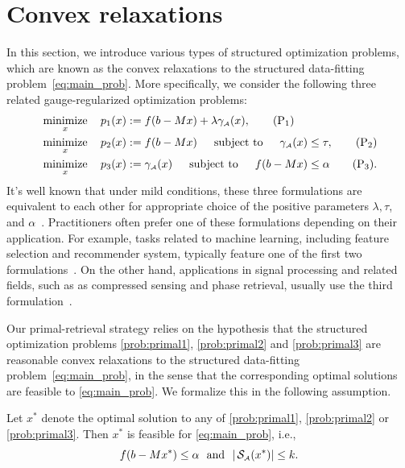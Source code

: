 \section{Convex relaxations}
\label{sec:4-2}

In this section, we introduce various types of structured optimization problems, which are known as the convex relaxations to the structured data-fitting problem~\eqref{eq:main_prob}. More specifically, 
we consider the following three related gauge-regularized optimization
problems:
\begin{align} 
  & \displaystyle\mathop{\hbox{\rm minimize}}_{x}\enspace\enspace p_1(x) := f(b - Mx) + \lambda\gamma_{\scriptscriptstyle\mathcal{A}}(x), \label{prob:primal1} \tag{P$_1$} \\
  & \displaystyle\mathop{\hbox{\rm minimize}}_{x}\enspace\enspace p_2(x) := f(b - Mx) \enspace\hbox{\quad subject to\quad}\enspace \gamma_{\scriptscriptstyle\mathcal{A}}(x) \leq \tau, \label{prob:primal2} \tag{P$_2$} \\
  & \displaystyle\mathop{\hbox{\rm minimize}}_{x}\enspace\enspace p_3(x) := \gamma_{\scriptscriptstyle\mathcal{A}}(x)  \enspace\hbox{\quad subject to\quad}\enspace f(b - Mx) \leq \alpha \label{prob:primal3} \tag{P$_3$}. 
\end{align}
It's well known that under mild conditions, these three formulations are equivalent to each other for appropriate choice of the positive parameters $\lambda, \tau$, and $\alpha$~\cite{FrieTsen:2006}. Practitioners often prefer one of these formulations depending on their application. For example, tasks related to machine learning, including feature selection and recommender system, typically feature one of the first two formulations~\cite{tibshirani1996regression,yul06,Meinshausen06}.  On the other hand, applications in signal processing and related fields, such as as compressed sensing and phase retrieval, usually use the third formulation~\cite{berg2008probing,candes:2013}. 

Our primal-retrieval strategy relies on the hypothesis that the structured optimization problems \eqref{prob:primal1}, \eqref{prob:primal2} and \eqref{prob:primal3} are reasonable convex relaxations to the structured data-fitting problem~\eqref{eq:main_prob}, in the sense that the corresponding optimal solutions are feasible to \eqref{eq:main_prob}. We formalize this in the following assumption.

\begin{assumption} \label{ass:blanket}
    Let $x^*$ denote the optimal solution to any of \eqref{prob:primal1}, \eqref{prob:primal2} or \eqref{prob:primal3}. Then $x^*$ is feasible for \eqref{eq:main_prob}, i.e., 
    \[f(b - Mx^*) \leq \alpha \enspace\mathop{\hbox{\rm and}}\enspace |\operatorname{\mathcal{S}_{\scriptscriptstyle\mathcal{A}}}(x^*)| \leq k.\]
\end{assumption}

